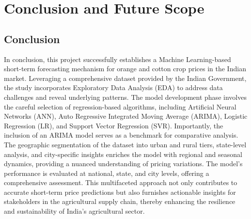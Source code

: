 \section{Conclusion and Future Scope}

    \subsection{Conclusion}
        In conclusion, this project successfully establishes a Machine Learning-based short-term forecasting mechanism for orange and cotton crop prices in the Indian market. Leveraging a comprehensive dataset provided by the Indian Government, the study incorporates Exploratory Data Analysis (EDA) to address data challenges and reveal underlying patterns. The model development phase involves the careful selection of regression-based algorithms, including Artificial Neural Networks (ANN), Auto Regressive Integrated Moving Average (ARIMA), Logistic Regression (LR), and Support Vector Regression (SVR). Importantly, the inclusion of an ARIMA model serves as a benchmark for comparative analysis. The geographic segmentation of the dataset into urban and rural tiers, state-level analysis, and city-specific insights enriches the model with regional and seasonal dynamics, providing a nuanced understanding of pricing variations. The model's performance is evaluated at national, state, and city levels, offering a comprehensive assessment. This multifaceted approach not only contributes to accurate short-term price predictions but also furnishes actionable insights for stakeholders in the agricultural supply chain, thereby enhancing the resilience and sustainability of India's agricultural sector.
    
